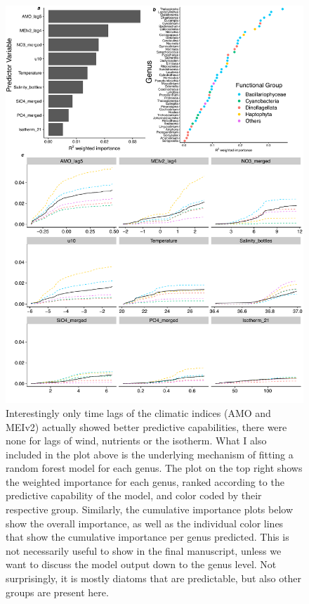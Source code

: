 \documentclass[draft]{agujournal2019}
\begin{document}
\begin{figure}
\noindent\includegraphics[width=\textwidth]{fig/GF_output_plot3.pdf}
\caption{Interestingly only time lags of the climatic indices (AMO and MEIv2) actually showed better predictive capabilities, there were none for lags of wind, nutrients or the isotherm. What I also included in the plot above is the underlying mechanism of fitting a random forest model for each genus. The plot on the top right shows the weighted importance for each genus, ranked according to the predictive capability of the model, and color coded by their respective group. Similarly, the cumulative importance plots below show the overall importance, as well as the individual color lines that show the cumulative importance per genus predicted. This is not necessarily useful to show in the final manuscript, unless we want to discuss the model output down to the genus level. Not surprisingly, it is mostly diatoms that are predictable, but also other groups are present here.}
\end{figure}
\end{document}
